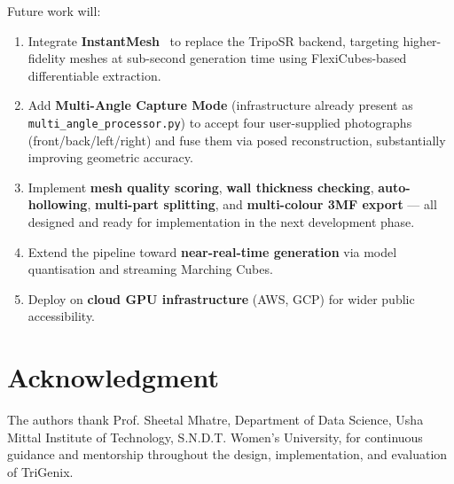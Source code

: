 \documentclass[conference]{IEEEtran}
\begin{document}
Future work will:
\begin{enumerate}
  \item Integrate \textbf{InstantMesh}~\cite{instantmesh} to replace the TripoSR backend, targeting
        higher-fidelity meshes at sub-second generation time using FlexiCubes-based differentiable extraction.
  \item Add \textbf{Multi-Angle Capture Mode} (infrastructure already present as \texttt{multi\_angle\_processor.py})
        to accept four user-supplied photographs (front/back/left/right) and fuse them via posed reconstruction,
        substantially improving geometric accuracy.
  \item Implement \textbf{mesh quality scoring}, \textbf{wall thickness checking}, \textbf{auto-hollowing},
        \textbf{multi-part splitting}, and \textbf{multi-colour 3MF export} — all designed and ready for
        implementation in the next development phase.
  \item Extend the pipeline toward \textbf{near-real-time generation} via model quantisation and streaming
        Marching Cubes.
  \item Deploy on \textbf{cloud GPU infrastructure} (AWS, GCP) for wider public accessibility.
\end{enumerate}


\section*{Acknowledgment}

The authors thank Prof. Sheetal Mhatre, Department of Data Science, Usha Mittal Institute of Technology,
S.N.D.T. Women's University, for continuous guidance and mentorship throughout the design, implementation,
and evaluation of TriGenix.
\end{document}
